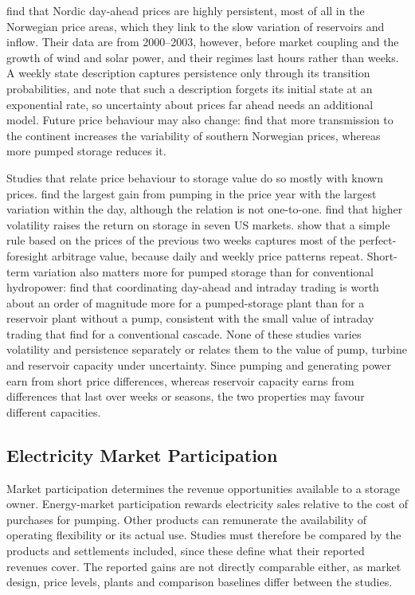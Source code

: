 \citet{haldrup2006regime} find that Nordic day-ahead prices are highly
persistent, most of all in the Norwegian price areas, which they link to
the slow variation of reservoirs and inflow. Their data are from
2000--2003, however, before market coupling and the growth of wind and
solar power, and their regimes last hours rather than weeks. A weekly
state description captures persistence only through its transition
probabilities, and \citet{mo2001} note that such a description forgets
its initial state at an exponential rate, so uncertainty about prices far
ahead needs an additional model. Future price behaviour may also change:
\citet{henden2016economic} find that more transmission to the continent
increases the variability of southern Norwegian prices, whereas more
pumped storage reduces it.

Studies that relate price behaviour to storage value do so mostly with
known prices. \citet{ak2019quantifying} find the largest gain from
pumping in the price year with the largest variation within the day,
although the relation is not one-to-one. \citet{bradbury2014economic}
find that higher volatility raises the return on storage in seven US
markets. \citet{sioshansi2009estimating} show that a simple rule based
on the prices of the previous two weeks captures most of the
perfect-foresight arbitrage value, because daily and weekly price
patterns repeat. Short-term variation also matters more for pumped
storage than for conventional hydropower: \citet{lohndorf2023} find that
coordinating day-ahead and intraday trading is worth about an order of
magnitude more for a pumped-storage plant than for a reservoir plant
without a pump, consistent with the small value of intraday trading that
\citet{faria2011day} find for a conventional cascade. None of these
studies varies volatility and persistence separately or relates them to
the value of pump, turbine and reservoir capacity under uncertainty.
Since pumping and generating power earn from short price differences,
whereas reservoir capacity earns from differences that last over weeks
or seasons, the two properties may favour different capacities.

\subsection{Electricity Market Participation}
\label{sec:lit_markets}

Market participation determines the revenue opportunities available to
a storage owner. Energy-market participation rewards electricity sales
relative to the cost of purchases for pumping. Other products can
remunerate the availability of operating flexibility or its actual use.
Studies must therefore be compared by the products and settlements
included, since these define what their reported revenues cover. The
reported gains are not directly comparable either, as market design,
price levels, plants and comparison baselines differ between the
studies.

